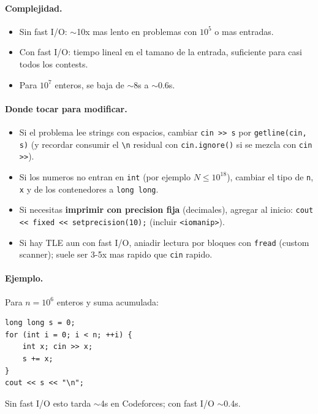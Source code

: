\paragraph{Complejidad.}
\begin{itemize}\setlength\itemsep{0pt}
	\item Sin fast I/O: $\sim$10x mas lento en problemas con $10^5$ o mas entradas.
	\item Con fast I/O: tiempo lineal en el tamano de la entrada, suficiente para casi todos los contests.
	\item Para $10^7$ enteros, se baja de $\sim$8s a $\sim$0.6s.
\end{itemize}

\paragraph{Donde tocar para modificar.}
\begin{itemize}\setlength\itemsep{0pt}
	\item Si el problema lee strings con espacios, cambiar \texttt{cin >> s} por \texttt{getline(cin, s)} (y recordar consumir el \texttt{\textbackslash n} residual con \texttt{cin.ignore()} si se mezcla con \texttt{cin >>}).
	\item Si los numeros no entran en \texttt{int} (por ejemplo $N \le 10^{18}$), cambiar el tipo de \texttt{n}, \texttt{x} y de los contenedores a \texttt{long long}.
	\item Si necesitas \textbf{imprimir con precision fija} (decimales), agregar al inicio: \texttt{cout << fixed << setprecision(10);} (incluir \texttt{<iomanip>}).
	\item Si hay TLE aun con fast I/O, aniadir lectura por bloques con \texttt{fread} (custom scanner); suele ser 3-5x mas rapido que \texttt{cin} rapido.
\end{itemize}

\paragraph{Ejemplo.}
Para $n = 10^6$ enteros y suma acumulada:
\begin{verbatim}
long long s = 0;
for (int i = 0; i < n; ++i) {
    int x; cin >> x;
    s += x;
}
cout << s << "\n";
\end{verbatim}
Sin fast I/O esto tarda $\sim$4s en Codeforces; con fast I/O $\sim$0.4s.

